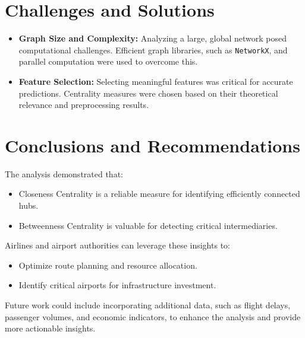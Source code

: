 \documentclass[12pt]{article}
\begin{document}
\section*{Challenges and Solutions}
\begin{itemize}
	\item \textbf{Graph Size and Complexity:} Analyzing a large, global network posed computational challenges. Efficient graph libraries, such as \texttt{NetworkX}, and parallel computation were used to overcome this.
	\item \textbf{Feature Selection:} Selecting meaningful features was critical for accurate predictions. Centrality measures were chosen based on their theoretical relevance and preprocessing results.
\end{itemize}

\section*{Conclusions and Recommendations}
The analysis demonstrated that:
\begin{itemize}
	\item Closeness Centrality is a reliable measure for identifying efficiently connected hubs.
	\item Betweenness Centrality is valuable for detecting critical intermediaries.
\end{itemize}
Airlines and airport authorities can leverage these insights to:
\begin{itemize}
	\item Optimize route planning and resource allocation.
	\item Identify critical airports for infrastructure investment.
\end{itemize}

Future work could include incorporating additional data, such as flight delays, passenger volumes, and economic indicators, to enhance the analysis and provide more actionable insights.
\end{document}
